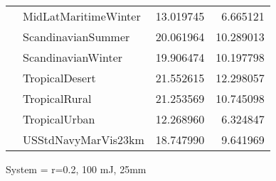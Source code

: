 \begin{tabular}{llrr}
             & MidLatMaritimeWinter &  13.019745 &   6.665121 \\
             & ScandinavianSummer &  20.061964 &  10.289013 \\
             & ScandinavianWinter &  19.906474 &  10.197798 \\
             & TropicalDesert &  21.552615 &  12.298057 \\
             & TropicalRural &  21.253569 &  10.745098 \\
             & TropicalUrban &  12.268960 &   6.324847 \\
             & USStdNavyMarVis23km &  18.747990 &   9.641969 \\
\bottomrule
\end{tabular}


\clearpage
System = r=0.2, 100 mJ, 25mm

